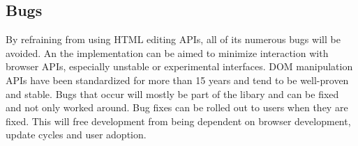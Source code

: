 \subsection{Bugs} %

By refraining from using HTML editing APIs, all of its numerous bugs will be avoided. An the implementation can be aimed to minimize interaction with browser APIs, especially unstable or experimental interfaces. DOM manipulation APIs have been standardized for more than 15 years and tend to be well-proven and stable. Bugs that occur will mostly be part of the libary and can be fixed and not only worked around. Bug fixes can be rolled out to users when they are fixed. This will free development from being dependent on browser development, update cycles and user adoption. 






